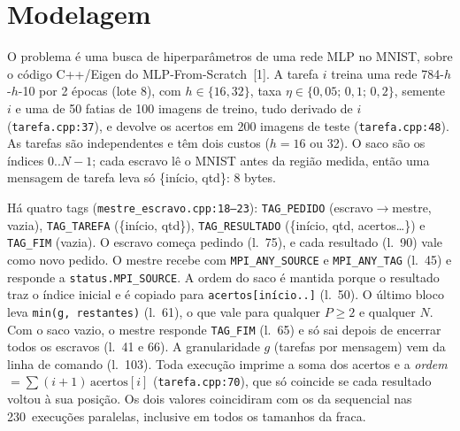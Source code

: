 \documentclass[10pt,a4paper,twocolumn]{article}
\newcommand{\cod}[1]{\texttt{\small #1}}
\begin{document}

\section{Modelagem}
O problema é uma busca de hiperparâmetros de uma rede MLP no MNIST, sobre o código C++/Eigen
do MLP-From-Scratch~[1]. A tarefa $i$ treina uma rede 784-$h$-$h$-10 por 2 épocas (lote 8),
com $h\in\{16,32\}$, taxa $\eta\in\{0{,}05;\,0{,}1;\,0{,}2\}$, semente $i$ e uma de 50 fatias
de 100 imagens de treino, tudo derivado de $i$ (\cod{tarefa.cpp:37}), e devolve os acertos em
200 imagens de teste (\cod{tarefa.cpp:48}). As tarefas são independentes e têm dois custos
($h=16$ ou 32). O saco são os índices $0..N-1$; cada escravo lê o MNIST antes da região medida,
então uma mensagem de tarefa leva só \{início, qtd\}: 8 bytes.

Há quatro tags (\cod{mestre\_escravo.cpp:18--23}): \cod{TAG\_PEDIDO} (escravo$\to$mestre,
vazia), \cod{TAG\_TAREFA} (\{início, qtd\}), \cod{TAG\_RESULTADO} (\{início, qtd, acertos\ldots\})
e \cod{TAG\_FIM} (vazia). O escravo começa pedindo (l.~75), e cada resultado (l.~90) vale como
novo pedido. O mestre recebe com \cod{MPI\_ANY\_SOURCE} e \cod{MPI\_ANY\_TAG} (l.~45) e responde
a \cod{status.MPI\_SOURCE}. A ordem do saco é mantida porque o resultado traz o índice inicial e
é copiado para \cod{acertos[início..]} (l.~50). O último bloco leva \cod{min(g, restantes)}
(l.~61), o que vale para qualquer $P\ge2$ e qualquer $N$. Com o saco vazio, o mestre responde
\cod{TAG\_FIM} (l.~65) e só sai depois de encerrar todos os escravos (l.~41 e 66). A granularidade
$g$ (tarefas por mensagem) vem da linha de comando (l.~103). Toda execução imprime a soma dos
acertos e a \emph{ordem} $=\sum(i+1)\,\mathrm{acertos}[i]$ (\cod{tarefa.cpp:70}), que só coincide
se cada resultado voltou à sua posição. Os dois valores coincidiram com os da sequencial nas
230~execuções paralelas, inclusive em todos os tamanhos da fraca.
\end{document}
